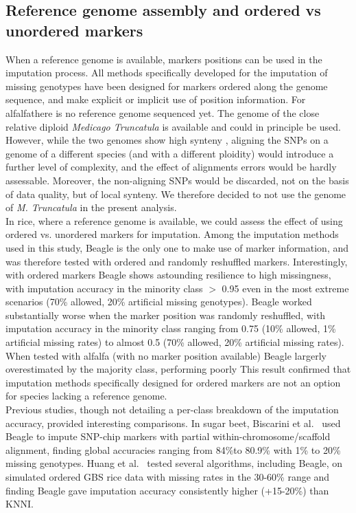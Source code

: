 \subsection{Reference genome assembly and ordered vs unordered markers}
\label{sec:reference_genome_ordered_vs_unordered}
When a reference genome is available, markers positions can be used in the imputation process. All methods specifically developed for the imputation of missing genotypes have been designed for markers ordered along the genome sequence, and make explicit or implicit use of position information.
For alfalfathere is no reference genome sequenced yet. The genome of the close relative diploid \emph{Medicago Truncatula} is available \cite{young_medicago_2011} and could in principle be used. However, while the two genomes show high synteny \cite{li_saturated_2014}, aligning the SNPs on a genome of a different species (and with a different ploidity) would introduce a further level of complexity, and the effect of alignments errors would be hardly assessable. Moreover, the non-aligning SNPs would be discarded, not on the basis of data quality, but of local synteny. We therefore decided to not use the genome of \emph{M. Truncatula} in the present analysis.\\
In rice, where a reference genome is available, we could assess the effect of using ordered vs. unordered markers for imputation. Among the imputation methods used in this study, Beagle is the only one to make use of marker information, and was therefore tested with ordered and randomly reshuffled markers. Interestingly, with ordered markers Beagle shows astounding resilience to high missingness, with imputation accuracy in the minority class $>$ 0.95 even in the most extreme scenarios (70\% allowed, 20\% artificial missing genotypes).
Beagle worked substantially worse when the marker position was randomly reshuffled, with imputation accuracy in the minority class ranging from 0.75 (10\% allowed, 1\% artificial missing rates) to almost 0.5 (70\% allowed, 20\% artificial missing rates). When tested with alfalfa (with no marker position available) Beagle largerly overestimated by the majority class, performing poorly
This result confirmed that imputation methods specifically designed for ordered markers are not an option for species lacking a reference genome.\\
Previous studies, though not detailing a per-class breakdown of the imputation accuracy, provided interesting comparisons. In sugar beet, Biscarini et al.~\cite{biscarini_genome-enabled_2014} used Beagle to impute SNP-chip markers with partial within-chromosome/scaffold alignment, finding global accuracies ranging from 84\%to 80.9\% with 1\% to 20\% missing genotypes. Huang et al.~\cite{huang_efficient_2014} tested several algorithms, including Beagle, on simulated ordered GBS rice data with missing rates in the 30-60\% range and finding Beagle gave imputation accuracy consistently higher (+15-20\%) than KNNI. 

